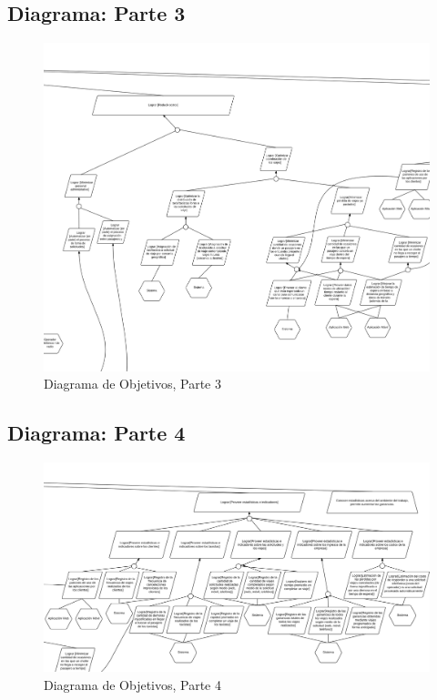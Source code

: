 \documentclass[a4paper, 10pt, twoside]{article}
\begin{document}
\subsection{Diagrama: Parte 3}
\begin{figure}[H]
  \includegraphics[width=\textwidth]{diagramas/diagrama-objetivos-2.png}
  \caption{Diagrama de Objetivos, Parte 3}
  \label{fig:diagrama-objetivos-2}
\end{figure}
\newpage
\subsection{Diagrama: Parte 4}
\begin{figure}[H]
  \includegraphics[width=\textwidth]{diagramas/diagrama-objetivos-3.png}
  \caption{Diagrama de Objetivos, Parte 4}
  \label{fig:diagrama-objetivos-3}
\end{figure}
\newpage
\end{document}
